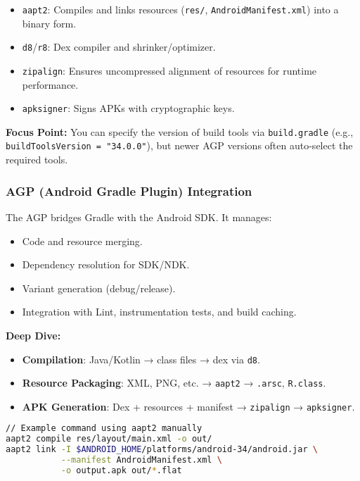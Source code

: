 \documentclass[a4paper,12pt]{article}
\begin{document}
\begin{itemize}
  \item \texttt{aapt2}: Compiles and links resources (\texttt{res/}, \texttt{AndroidManifest.xml}) into a binary form.
  \item \texttt{d8}/\texttt{r8}: Dex compiler and shrinker/optimizer.
  \item \texttt{zipalign}: Ensures uncompressed alignment of resources for runtime performance.
  \item \texttt{apksigner}: Signs APKs with cryptographic keys.
\end{itemize}

\textbf{Focus Point:} You can specify the version of build tools via \texttt{build.gradle} (e.g., \texttt{buildToolsVersion = "34.0.0"}), but newer AGP versions often auto-select the required tools.

\subsubsection{AGP (Android Gradle Plugin) Integration}

The AGP bridges Gradle with the Android SDK. It manages:

\begin{itemize}
  \item Code and resource merging.
  \item Dependency resolution for SDK/NDK.
  \item Variant generation (debug/release).
  \item Integration with Lint, instrumentation tests, and build caching.
\end{itemize}

\textbf{Deep Dive:}

\begin{itemize}
  \item \textbf{Compilation}: Java/Kotlin → class files → dex via \texttt{d8}.
  \item \textbf{Resource Packaging}: XML, PNG, etc. → \texttt{aapt2} → \texttt{.arsc}, \texttt{R.class}.
  \item \textbf{APK Generation}: Dex + resources + manifest → \texttt{zipalign} → \texttt{apksigner}.
\end{itemize}

\begin{lstlisting}[language=bash]
// Example command using aapt2 manually
aapt2 compile res/layout/main.xml -o out/
aapt2 link -I $ANDROID_HOME/platforms/android-34/android.jar \
           --manifest AndroidManifest.xml \
           -o output.apk out/*.flat
\end{lstlisting}
\end{document}
